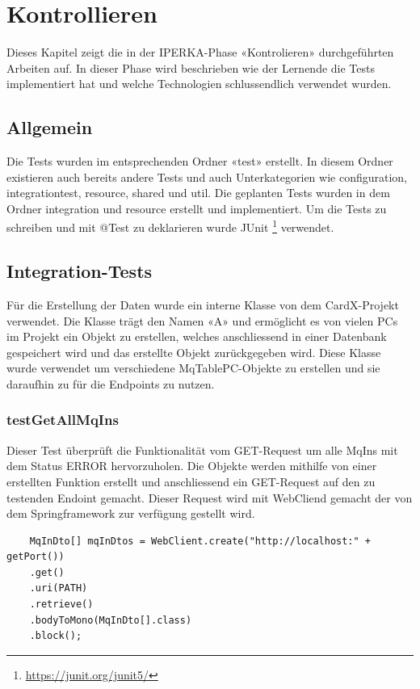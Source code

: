\chapter{Kontrollieren}\label{ch:kontrollieren}
Dieses Kapitel zeigt die in der IPERKA-Phase «Kontrolieren» durchgeführten Arbeiten auf. In dieser Phase wird beschrieben wie der Lernende die Tests implementiert hat und welche Technologien schlussendlich verwendet wurden.

\section{Allgemein}
Die Tests wurden im entsprechenden Ordner «test» erstellt. In diesem Ordner existieren auch bereits andere Tests und auch Unterkategorien wie configuration, integrationtest, resource, shared und util. Die geplanten Tests wurden in dem Ordner integration und resource erstellt und implementiert. Um die Tests zu schreiben und mit @Test zu deklarieren wurde JUnit \footnote{\url{https://junit.org/junit5/}} verwendet.

\section{Integration-Tests}
Für die Erstellung der Daten wurde ein interne Klasse von dem CardX-Projekt verwendet. Die Klasse trägt den Namen «A» und ermöglicht es von vielen PCs im Projekt ein Objekt zu erstellen, welches anschliessend in einer Datenbank gespeichert wird und das erstellte Objekt zurückgegeben wird. Diese Klasse wurde verwendet um verschiedene MqTablePC-Objekte zu erstellen und sie daraufhin zu für die Endpoints zu nutzen.

\subsection{testGetAllMqIns}
Dieser Test überprüft die Funktionalität vom GET-Request um alle MqIns mit dem Status ERROR hervorzuholen. Die Objekte werden mithilfe von einer erstellten Funktion erstellt und anschliessend ein GET-Request auf den zu testenden Endoint gemacht. Dieser Request wird mit WebCliend gemacht der von dem Springframework zur verfügung gestellt wird.

\begin{verbatim}
	MqInDto[] mqInDtos = WebClient.create("http://localhost:" + getPort())
	.get()
	.uri(PATH)
	.retrieve()
	.bodyToMono(MqInDto[].class)
	.block();
\end{verbatim}

